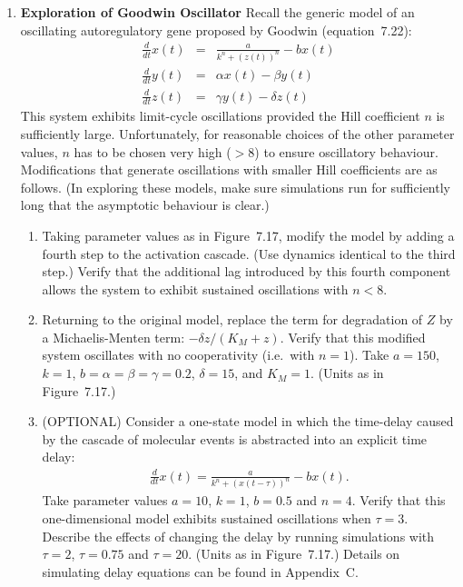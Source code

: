 \documentclass[12pt]{article}
\newcommand{\beqn}{\begin{eqnarray}}
\newcommand{\eeqn}{\end{eqnarray}}
\def \beqn {\begin{eqnarray*}}
\def \eeqn {\end{eqnarray*}}
\begin{document}
\begin{enumerate}
\item {\bf Exploration of Goodwin Oscillator} Recall the generic model of an oscillating autoregulatory gene proposed by Goodwin (equation~7.22):
\beqn
\frac{d}{dt} x(t) &=& \frac{a}{k^n+(z(t))^n} - b x(t)  \\
\frac{d}{dt} y(t) &=& \alpha x(t) - \beta y(t) \\
\frac{d}{dt} z(t) &=& \gamma y(t) - \delta z(t) 
\eeqn
This system exhibits limit-cycle oscillations provided the Hill coefficient $n$ is sufficiently large.  Unfortunately, for reasonable choices of the other parameter values, $n$ has to be chosen very high ($>8$) to ensure oscillatory behaviour.  Modifications that generate oscillations with smaller Hill coefficients are as follows.  (In exploring these models, make sure simulations run for sufficiently long that the asymptotic behaviour is clear.) 

\begin{enumerate}
\item Taking parameter values as in Figure~7.17, modify the model by adding a fourth step to the activation cascade. (Use dynamics identical to the third step.)  Verify that the additional lag introduced by this fourth component allows the system to exhibit sustained oscillations with  $n<8$. %

\item Returning to the original model, replace the term for degradation of $Z$ by a Michaelis-Menten term: $-\delta z/(K_M+z)$.  Verify that this modified system oscillates with no cooperativity (i.e.~with $n=1$).   Take $a=150$, $k=1$, $b=\alpha=\beta=\gamma=0.2$, $\delta=15$, and $K_M=1$. (Units as in Figure~7.17.)


\item (OPTIONAL) Consider a one-state model in which the time-delay caused by the cascade of molecular events is abstracted into an explicit time delay:
\beqn 
\frac{d}{dt} x(t) = \frac{a}{k^n+(x(t-\tau))^n} - b x(t). 
\eeqn 
Take parameter values $a=10$, $k=1$, $b=0.5$ and $n=4$.  Verify that this one-dimensional model exhibits sustained oscillations when $\tau=3$.  Describe the effects of changing the delay by running simulations with $\tau=2$, $\tau=0.75$ and $\tau=20$. (Units as in Figure~7.17.) Details on simulating delay equations can be found in Appendix~C.


\end{enumerate}

\end{enumerate}
\end{document}
